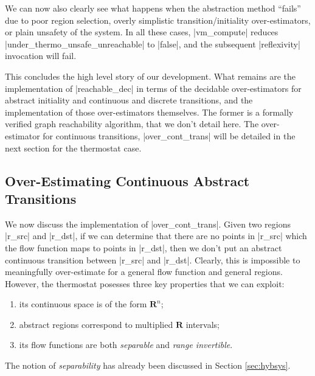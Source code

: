 \documentclass[runningheads]{llncs}
\newcommand{\IR}{{\mathbf R}}
\begin{document}
We can now also clearly see what happens when the abstraction method ``fails'' due to poor region selection, overly simplistic transition/initiality over-estimators, or plain unsafety of the system. In all these cases, |vm_compute| reduces |under_thermo_unsafe_unreachable| to |false|, and the subsequent |reflexivity| invocation will fail.

This concludes the high level story of our development. What remains
are the implementation of |reachable_dec| in terms of the decidable
over-estimators for abstract initiality and continuous and discrete
transitions, and the implementation of those over-estimators
themselves. The former is a formally verified graph reachability
algorithm, that we don't detail here. The over-estimator for continuous
transitions, |over_cont_trans| will be detailed in the next section
for the thermostat case.

\subsection{Over-Estimating Continuous Abstract Transitions}
\label{over_cont_trans}

We now discuss the implementation of  |over_cont_trans|.
Given two regions |r_src| and |r_dst|, 
if we can determine that there
are no points in |r_src| which the flow function maps to points in
|r_dst|, then we don't put an abstract continuous transition between |r_src|
and |r_dst|. Clearly, this is impossible to
meaningfully over-estimate for a general flow function and general
regions. However, the thermostat posesses three key properties that
we can exploit:
\begin{enumerate}
\item its continuous space is of the form $\IR^n$;
\item abstract regions correspond to multiplied $\IR$ intervals;
\item its flow functions are both {\em separable\/} and {\em range invertible}.
\end{enumerate}

The notion of {\em separability\/} has already been discussed in
Section \ref{sec:hybsys}.
\end{document}
